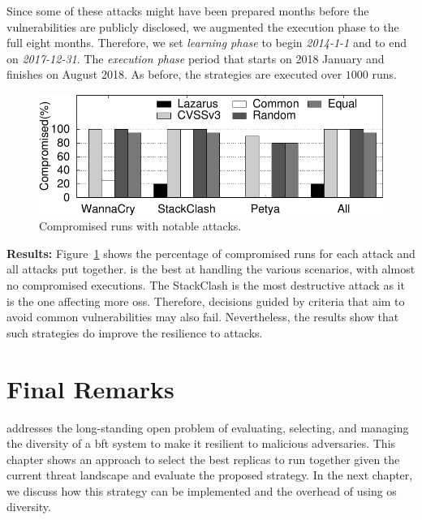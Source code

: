 Since some of these attacks might have been prepared months before the vulnerabilities are publicly disclosed, we augmented the execution phase to the full eight months. 
Therefore, we set \emph{learning phase} to begin \emph{2014-1-1} and to end on \emph{2017-12-31}. 
The \emph{execution phase} period that starts on 2018 January and finishes on August 2018. 
As before, the strategies are executed over $1000$ runs. 


\begin{figure}[t]
\begin{center}
\includegraphics[width=\columnwidth]{images/gnuplot/attacks/attacks.pdf}
\caption{Compromised runs with notable attacks.}
\label{fig:special_vulns}
\end{center}
\end{figure}

\textbf{Results:}
Figure~\ref{fig:special_vulns} shows the percentage of compromised runs for each attack and all attacks put together.
\system is the best at handling the various scenarios, with almost no compromised executions.
The StackClash is the most destructive attack as it is the one affecting more \glspl{os}.
Therefore, decisions guided by criteria that aim to avoid common vulnerabilities may also fail. 
Nevertheless, the results show that such strategies do improve the resilience to attacks.



\section{Final Remarks}
\label{sec:finalremarkslazarusdesign}

\system addresses the long-standing open problem of evaluating, selecting, and managing the diversity of a \gls{bft} system to make it resilient to malicious adversaries.
This chapter shows an approach to select the best replicas to run together given the current threat landscape and evaluate the proposed strategy.
In the next chapter, we discuss how this strategy can be implemented and the overhead of using \gls{os} diversity.

